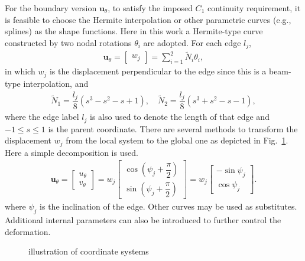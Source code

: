 \documentclass[3p,sort&compress,review,11pt]{elsarticle}
\newcommand*{\figref}[1]{Fig.~\ref{#1}}
\begin{document}
For the boundary version $\mathbold{u}_\theta$, to satisfy the imposed $C_1$ continuity requirement, it is feasible to choose the Hermite interpolation or other parametric curves (e.g., splines) as the shape functions. Here in this work a Hermite-type curve constructed by two nodal rotations $\theta_i$ are adopted. For each edge $l_j$,
\begin{gather*}
\mathbold{u}_\theta=\begin{bmatrix}w_j\end{bmatrix}=\sum_{i=1}^{2}\tilde{N}_i\theta_i,
\end{gather*}
in which $w_j$ is the displacement perpendicular to the edge since this is a beam-type interpolation, and
\begin{gather*}
\tilde{N}_1=\dfrac{l_j}{8}\left(s^3-s^2-s+1\right),\quad
\tilde{N}_2=\dfrac{l_j}{8}\left(s^3+s^2-s-1\right),
\end{gather*}
where the edge label $l_j$ is also used to denote the length of that edge and $-1\leqslant{}s\leqslant1$ is the parent coordinate. There are several methods to transform the displacement $w_j$ from the local system to the global one as depicted in \figref{fig:coordinate_system}. Here a simple decomposition is used.
\begin{gather}
\mathbold{u}_\theta=\begin{bmatrix}u_\theta\\v_\theta\end{bmatrix}=w_j\begin{bmatrix}\cos\left(\psi_j+\dfrac{\pi}{2}\right)\\[2mm]\sin\left(\psi_j+\dfrac{\pi}{2}\right)\end{bmatrix}=w_j\begin{bmatrix}-\sin\psi_j\\[2mm]\cos\psi_j\end{bmatrix}.
\end{gather}
where $\psi_j$ is the inclination of the edge. Other curves may be used as substitutes. Additional internal parameters can also be introduced to further control the deformation.
\begin{figure}[H]
\centering\scriptsize
{}
\caption{illustration of coordinate systems}\label{fig:coordinate_system}
\end{figure}
\end{document}
